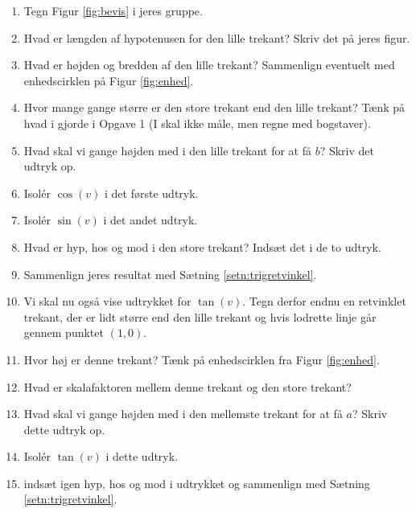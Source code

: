 \begin{enumerate}[label=\roman*)]
	\item Tegn Figur \ref{fig:bevis} i jeres gruppe. 
	\item Hvad er længden af hypotenusen for den lille trekant? Skriv det på jeres figur.
	\item Hvad er højden og bredden af den lille trekant? Sammenlign eventuelt med enhedscirklen på Figur \ref{fig:enhed}.
	\item Hvor mange gange større er den store trekant end den lille trekant? Tænk på hvad i gjorde i Opgave 1 (I skal ikke måle, men regne med bogstaver).
 	\item Hvad skal vi gange højden med i den lille trekant for at få $b$? Skriv det udtryk op.
	\item Isolér $\cos(v)$ i det første udtryk. 
	\item Isolér $\sin(v)$ i det andet udtryk. 
	\item Hvad er hyp, hos og mod i den store trekant? Indsæt det i de to udtryk. 
	\item Sammenlign jeres resultat med Sætning \ref{setn:trigretvinkel}.
	\item Vi skal nu også vise udtrykket for $\tan(v)$. Tegn derfor endnu en retvinklet trekant, der er lidt større end 
	den lille trekant og hvis lodrette linje går gennem punktet $(1,0)$. 
	\item Hvor høj er denne trekant? Tænk på enhedscirklen fra Figur \ref{fig:enhed}.
	\item Hvad er skalafaktoren mellem denne trekant og den store trekant?
	\item Hvad skal vi gange højden med i den mellemste trekant for at få $a$? Skriv dette udtryk op.
	\item Isolér $\tan(v)$ i dette udtryk.
	\item indsæt igen hyp, hos og mod i udtrykket og sammenlign med Sætning \ref{setn:trigretvinkel}.
\end{enumerate}

